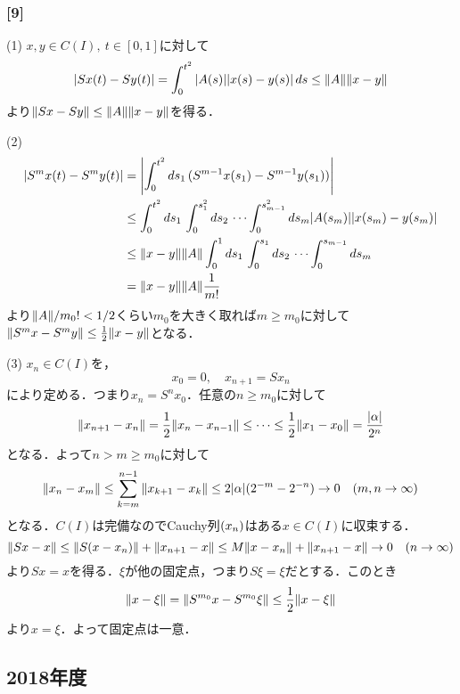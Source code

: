 \documentclass[a4j]{ltjsarticle}
\newcommand{\1}{\mathbbm{1}}
\numberwithin{equation}{section}
\theoremstyle{definition}
\begin{document}
\subsubsection*{[9]}
(1) $x,y\in C(I),\ t\in[0,1]$に対して
\begin{equation}
    \abs{Sx(t)-Sy(t)}=\int_{0}^{t^2}\abs{A(s)}\abs{x(s)-y(s)}\,ds\leq \norm{A}\norm{x-y}
\end{equation}
より$\norm{Sx-Sy}\leq \norm{A}\norm{x-y}$を得る．

(2) 
\begin{align}
    \abs{S^mx(t)-S^my(t)}&=\abs{\int_{0}^{t^2}ds_1\,(S^{m-1}x(s_1)-S^{m-1}y(s_1))}\\
    &\leq \int_{0}^{t^2}ds_1\,\int_{0}^{s_1^2}ds_2\,\cdots\int_{0}^{s_{m-1}^2}ds_m \abs{A(s_m)}\abs{x(s_m)-y(s_m)}\\
    &\leq \norm{x-y}\norm{A}\int_{0}^{1}ds_1\,\int_{0}^{s_1}ds_2\,\cdots\int_{0}^{s_{m-1}}ds_m\\
    &=\norm{x-y}\norm{A}\frac{1}{m!}
\end{align}
より$\norm{A}/m_0!<1/2$くらい$m_0$を大きく取れば$m\geq m_0$に対して$\norm{S^mx-S^my}\leq \frac{1}{2}\norm{x-y}$となる．

(3) $x_n\in C(I)$を，
\begin{equation}
    x_0=0,\quad x_{n+1}=Sx_n 
\end{equation}
により定める．つまり$x_n=S^nx_0$．任意の$n\geq m_0$に対して
\begin{equation}
    \norm{x_{n+1}-x_n}=\frac{1}{2}\norm{x_n-x_{n-1}}\leq \cdots \leq\frac{1}{2}\norm{x_1-x_0}=\frac{\abs{\alpha}}{2^n}
\end{equation}
となる．よって$n>m\geq m_0$に対して
\begin{equation}
    \norm{x_n-x_m}\leq\sum_{k=m}^{n-1}\norm{x_{k+1}-x_k}\leq 2\abs{\alpha} (2^{-m}-2^{-n})\to0\quad (m,n\to\infty)
\end{equation}
となる．$C(I)$は完備なのでCauchy列$\qty(x_n)$はある$x\in C(I)$に収束する．
\begin{equation}
    \norm{Sx-x}\leq \norm{S(x-x_n)}+\norm{x_{n+1}-x}\leq M\norm{x-x_n}+\norm{x_{n+1}-x}\to0\quad (n\to\infty)
\end{equation}
より$Sx=x$を得る．$\xi$が他の固定点，つまり$S\xi=\xi$だとする．このとき
\begin{equation}
    \norm{x-\xi}=\norm{S^{m_0}x-S^{m_0}\xi}\leq \frac{1}{2}\norm{x-\xi}
\end{equation}
より$x=\xi$．よって固定点は一意．
\subsection{2018年度}
\end{document}
